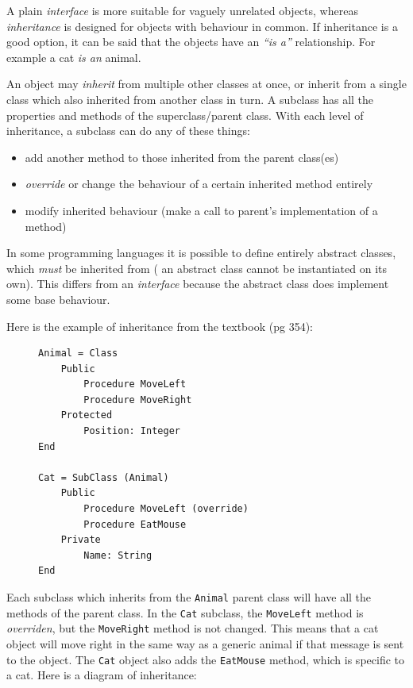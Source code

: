 \documentclass[9pt]{article}
\begin{document}
A plain \emph{interface} is more suitable for vaguely unrelated objects, whereas \emph{inheritance} is designed for objects with behaviour in common. If inheritance is a good option, it can be said that the objects have an \emph{``is a''} relationship. For example a cat \emph{is an} animal.

An object may \emph{inherit} from multiple other classes at once, or inherit from a single class which also inherited from another class in turn. A subclass has all the properties and methods of the superclass/parent class. With each level of inheritance, a subclass can do any of these things:

\begin{itemize}
\item add another method to those inherited from the parent class(es)
\item \emph{override} or change the behaviour of a certain inherited method entirely
\item modify inherited behaviour (make a call to parent's implementation of a method)
\end{itemize}

In some programming languages it is possible to define entirely abstract classes, which \emph{must} be inherited from ( an abstract class cannot be instantiated on its own). This differs from an \emph{interface} because the abstract class does implement some base behaviour.

Here is the example of inheritance from the textbook (pg 354):

\begin{figure}[H]
\begin{verbatim}
Animal = Class
    Public
        Procedure MoveLeft
        Procedure MoveRight
    Protected
        Position: Integer
End

Cat = SubClass (Animal)
    Public
        Procedure MoveLeft (override)
        Procedure EatMouse
    Private
        Name: String
End
\end{verbatim}
\end{figure}


Each subclass which inherits from the \texttt{Animal} parent class will have all the methods of the parent class. In the \texttt{Cat} subclass, the \texttt{MoveLeft} method is \emph{overriden}, but the \texttt{MoveRight} method is not changed. This means that a cat object will move right in the same way as a generic animal if that message is sent to the object. The \texttt{Cat} object also adds the \texttt{EatMouse} method, which is specific to a cat. Here is a diagram of inheritance:
\end{document}
